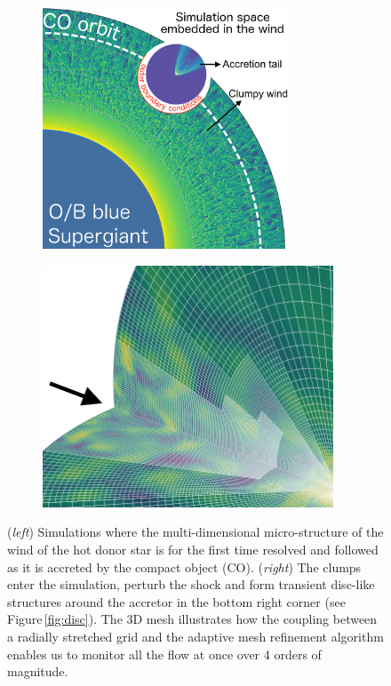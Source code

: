 \documentclass[letterpaper,12pt,onecolumn]{article}
\begin{document}
\begin{figure}[!b]
  \hspace*{-2.2cm}
\begin{subfigure}{0.45\columnwidth}
  \includegraphics[height=7.2cm]{Figures/config_SgXB_clumps.png}	
\end{subfigure}%
\begin{subfigure}{0.45\columnwidth}
  \hspace*{0.7cm}
  \includegraphics[height=7.2cm]{Figures/mesh.jpeg}	
\end{subfigure}
\caption{(\textit{left}) Simulations where the multi-dimensional micro-structure of the wind of the hot donor star is for the first time resolved and followed as it is accreted by the compact object (CO). (\textit{right}) The clumps enter the simulation, perturb the shock and form transient disc-like structures around the accretor in the bottom right corner (see Figure\,\ref{fig:disc}). The 3D mesh illustrates how the coupling between a radially stretched grid and the adaptive mesh refinement algorithm enables us to monitor all the flow at once over 4 orders of magnitude.}
\label{fig:config_SgXB_and_mesh}
\end{figure}
\end{document}

